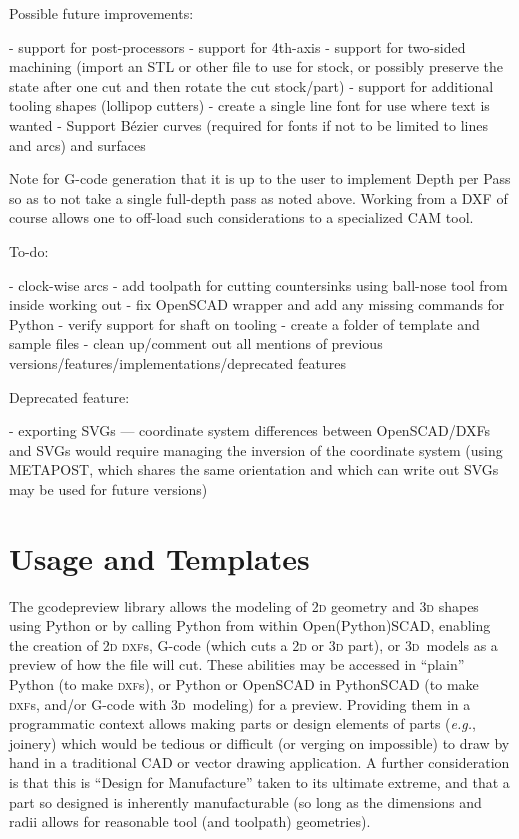 \documentclass{ltxdoc}
\begin{document}
\begin{readme}
Possible future improvements:

 - support for post-processors
 - support for 4th-axis
 - support for two-sided machining (import an STL or other file to use for stock, or possibly preserve the state after one cut and then rotate the cut stock/part)
 - support for additional tooling shapes (lollipop cutters)
 - create a single line font for use where text is wanted
 - Support Bézier curves (required for fonts if not to be limited to lines and arcs) and surfaces

Note for G-code generation that it is up to the user to implement Depth per Pass so as to not take a single full-depth pass as noted above. Working from a DXF of course allows one to off-load such considerations to a specialized CAM tool.

To-do:

 - clock-wise arcs
 - add toolpath for cutting countersinks using ball-nose tool from inside working out
 - fix OpenSCAD wrapper and add any missing commands for Python
 - verify support for shaft on tooling
 - create a folder of template and sample files
 - clean up/comment out all mentions of previous versions/features/implementations/deprecated features

Deprecated feature:

 - exporting SVGs --- coordinate system differences between OpenSCAD/DXFs and SVGs would require managing the inversion of the coordinate system (using METAPOST, which shares the same orientation and which can write out SVGs may be used for future versions)

\end{readme}



\clearpage

\section{Usage and Templates}

The gcodepreview library allows the modeling of \textsc{2d} geometry and \textsc{3d} shapes using Python or by calling Python from within Open(Python)SCAD, enabling the creation of \textsc{2d} \textsc{dxf}s, G-code (which cuts a \textsc{2d} or \textsc{3d} part), or \textsc{3d}~models as a preview of how the file will cut. These abilities may be accessed in ``plain'' Python (to make \textsc{dxf}s), or Python or OpenSCAD in PythonSCAD (to make \textsc{dxf}s, and/or G-code with \textsc{3d}~modeling) for a preview. Providing them in a programmatic context allows making parts or design elements of parts (\emph{e.g.}, joinery) which would be tedious or difficult (or verging on impossible) to draw by hand in a traditional CAD or vector drawing application. A further consideration is that this is ``Design for Manufacture'' taken to its ultimate extreme, and that a part so designed is inherently manufacturable (so long as the dimensions and radii allows for reasonable tool (and toolpath) geometries).
\end{document}
